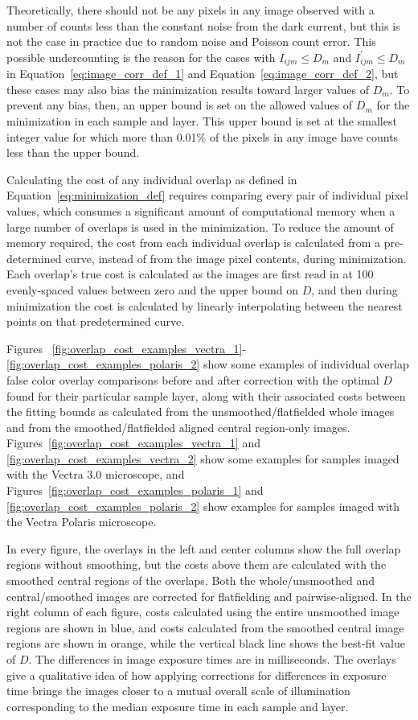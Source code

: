 \documentclass[letterpaper,11pt]{article}
\newcommand{\refeq}[1]{Equation~\ref{#1}}
\begin{document}
Theoretically, there should not be any pixels in any image observed with a number of counts less than the constant noise from the dark current, but this is not the case in practice due to random noise and Poisson count error. This possible undercounting is the reason for the cases with $I_{ijm} \leq D_{m}$ and $I^{\prime}_{ijm} \leq D_{m}$ in \refeq{eq:image_corr_def_1} and \refeq{eq:image_corr_def_2}, but these cases may also bias the minimization results toward larger values of $D_{m}$. To prevent any bias, then, an upper bound is set on the allowed values of $D_{m}$ for the minimization in each sample and layer. This upper bound is set at the smallest integer value for which more than 0.01\% of the pixels in any image have counts less than the upper bound.

Calculating the cost of any individual overlap as defined in \refeq{eq:minimization_def} requires comparing every pair of individual pixel values, which consumes a significant amount of computational memory when a large number of overlaps is used in the minimization. To reduce the amount of memory required, the cost from each individual overlap is calculated from a pre-determined curve, instead of from the image pixel contents, during minimization. Each overlap's true cost is calculated as the images are first read in at 100 evenly-spaced values between zero and the upper bound on $D$, and then during minimization the cost is calculated by linearly interpolating between the nearest points on that predetermined curve. 

Figures ~\ref{fig:overlap_cost_examples_vectra_1}-\ref{fig:overlap_cost_examples_polaris_2} show some examples of individual overlap false color overlay comparisons before and after correction with the optimal $D$ found for their particular sample layer, along with their associated costs between the fitting bounds as calculated from the unsmoothed/flatfielded whole images and from the smoothed/flatfielded aligned central region-only images. Figures~\ref{fig:overlap_cost_examples_vectra_1} and \ref{fig:overlap_cost_examples_vectra_2} show some examples for samples imaged with the Vectra 3.0 microscope, and Figures~\ref{fig:overlap_cost_examples_polaris_1} and \ref{fig:overlap_cost_examples_polaris_2} show examples for samples imaged with the Vectra Polaris microscope. 

In every figure, the overlays in the left and center columns show the full overlap regions without smoothing, but the costs above them are calculated with the smoothed central regions of the overlaps. Both the whole/unsmoothed and central/smoothed images are corrected for flatfielding and pairwise-aligned. In the right column of each figure, costs calculated using the entire unsmoothed image regions are shown in blue, and costs calculated from the smoothed central image regions are shown in orange, while the vertical black line shows the best-fit value of $D$. The differences in image exposure times are in milliseconds. The overlays give a qualitative idea of how applying corrections for differences in exposure time brings the images closer to a mutual overall scale of illumination corresponding to the median exposure time in each sample and layer.
\end{document}
